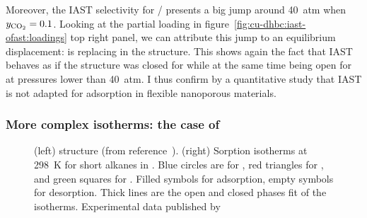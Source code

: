 \documentclass[thesis]{subfiles}
\begin{document}
Moreover, the IAST selectivity for / presents a big jump around
\SI{40}{atm} when $y_{\ce{CO2}} = 0.1$. Looking at the partial loading in
figure~\ref{fig:cu-dhbc:iast-ofast:loadings} top right panel, we can attribute
this jump to an equilibrium displacement:  is replacing  in the
structure. This shows again the fact that IAST behaves as if the structure was
closed for  while at the same time being open for  at pressures
lower than \SI{40}{atm}. I thus confirm by a quantitative study that IAST is not
adapted for adsorption in flexible nanoporous materials.

\FloatBarrier
\subsubsection{More complex isotherms: the case of \RPMZn}

\begin{figure}[htp]
    \centering
    \hfill
    \raisebox{-0.5\height}{}
    \caption{(left) \RPMZn structure (from reference~\cite{Lan2009}).
    (right) Sorption isotherms at \SI{298}{K} for short
    alkanes in \RPMZn. Blue circles are for , red triangles for
    , and green squares for . Filled symbols for adsorption,
    empty symbols for desorption. Thick lines are the open and closed phases fit
    of the isotherms. Experimental data published by
    \citeauthor{Nijem2012}\cite{Nijem2012}}
    \label{fig:rpm3-zn}
\end{figure}
\end{document}
